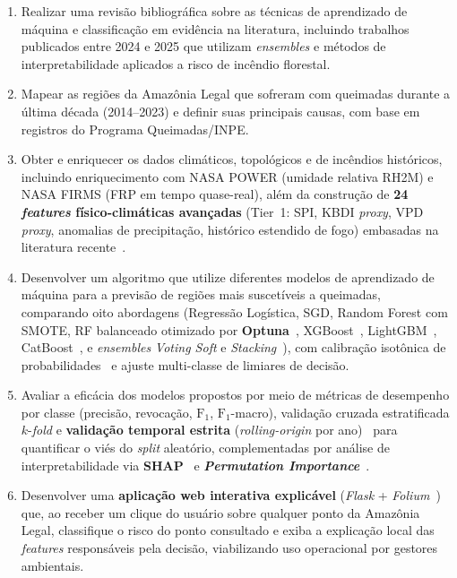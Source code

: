 \begin{enumerate}
  \item Realizar uma revisão bibliográfica sobre as técnicas de aprendizado de máquina e classificação em evidência na literatura, incluindo trabalhos publicados entre 2024 e 2025 que utilizam \emph{ensembles} e métodos de interpretabilidade aplicados a risco de incêndio florestal.

  \item Mapear as regiões da Amazônia Legal que sofreram com queimadas durante a última década (2014--2023) e definir suas principais causas, com base em registros do Programa Queimadas/INPE.

  \item Obter e enriquecer os dados climáticos, topológicos e de incêndios históricos, incluindo enriquecimento com NASA POWER (umidade relativa RH2M) e NASA FIRMS (FRP em tempo quase-real), além da construção de \textbf{24 \emph{features} físico-climáticas avançadas} (Tier~1: SPI, KBDI \emph{proxy}, VPD \emph{proxy}, anomalias de precipitação, histórico estendido de fogo) embasadas na literatura recente~\cite{seager2015climatology,forests2024cerradoamazon,npjhazards2025fire}.

  \item Desenvolver um algoritmo que utilize diferentes modelos de aprendizado de máquina para a previsão de regiões mais suscetíveis a queimadas, comparando oito abordagens (Regressão Logística, SGD, Random Forest com SMOTE, RF balanceado otimizado por \textbf{Optuna}~\cite{akiba2019optuna}, XGBoost~\cite{chen2016xgboost}, LightGBM~\cite{ke2017lightgbm}, CatBoost~\cite{prokhorenkova2018catboost}, e \emph{ensembles} \emph{Voting Soft} e \emph{Stacking}~\cite{wolpert1992stacked}), com calibração isotônica de probabilidades~\cite{zadrozny2002transforming} e ajuste multi-classe de limiares de decisão.

  \item Avaliar a eficácia dos modelos propostos por meio de métricas de desempenho por classe (precisão, revocação, \(\text{F}_1\), \(\text{F}_1\)-macro), validação cruzada estratificada \(k\)-\emph{fold} e \textbf{validação temporal estrita} (\emph{rolling-origin} por ano)~\cite{bergmeir2012cv} para quantificar o viés do \emph{split} aleatório, complementadas por análise de interpretabilidade via \textbf{SHAP}~\cite{lundberg2017unified,lundberg2020local} e \textbf{\emph{Permutation Importance}}~\cite{breiman2001random,fisher2019all}.

  \item Desenvolver uma \textbf{aplicação web interativa explicável} (\emph{Flask} + \emph{Folium}~\cite{folium,leafletjs}) que, ao receber um clique do usuário sobre qualquer ponto da Amazônia Legal, classifique o risco do ponto consultado e exiba a explicação local das \emph{features} responsáveis pela decisão, viabilizando uso operacional por gestores ambientais.
\end{enumerate}

